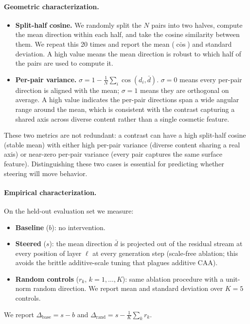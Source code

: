 \documentclass{article}
\begin{document}
\paragraph{Geometric characterization.}
\begin{itemize}
\item \textbf{Split-half cosine.} We randomly split the $N$ pairs
into two halves, compute the mean direction within each half, and
take the cosine similarity between them. We repeat this 20 times
and report the mean ($\bar{\cos}$) and standard deviation.
A high value means the mean direction is robust to which half of
the pairs are used to compute it.
\item \textbf{Per-pair variance.}
$\sigma = 1 - \tfrac{1}{N}\sum_i \cos(d_i, \bar d)$.
$\sigma = 0$ means every per-pair direction is aligned with the
mean; $\sigma = 1$ means they are orthogonal on average.
A high value indicates the per-pair directions span a wide angular
range around the mean, which is consistent with the contrast
capturing a shared axis across diverse content rather than a single
cosmetic feature.
\end{itemize}
These two metrics are not redundant: a contrast can have a high
split-half cosine (stable mean) with either high per-pair variance
(diverse content sharing a real axis) or near-zero per-pair variance
(every pair captures the same surface feature). Distinguishing these
two cases is essential for predicting whether steering will move
behavior.

\paragraph{Empirical characterization.}
On the held-out evaluation set we measure:
\begin{itemize}
\item \textbf{Baseline} ($b$): no intervention.
\item \textbf{Steered} ($s$): the mean direction $\bar d$ is
projected out of the residual stream at every position of layer
$\ell$ at every generation step (scale-free ablation; this avoids
the brittle additive-scale tuning that plagues additive CAA).
\item \textbf{Random controls} ($r_k$, $k = 1,\ldots,K$): same
ablation procedure with a unit-norm random direction. We report
mean and standard deviation over $K = 5$ controls.
\end{itemize}
We report
$\Delta_{\text{base}} = s - b$ and
$\Delta_{\text{rand}} = s - \tfrac{1}{K}\sum_k r_k$.
\end{document}
